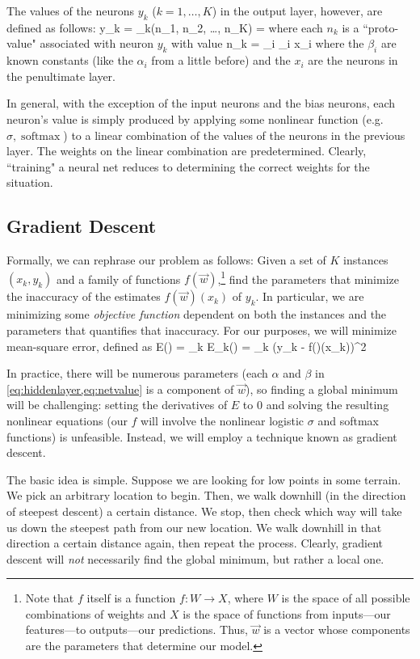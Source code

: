 \documentclass[10pt]{article}
\DeclareMathOperator{\softmax}{softmax}
\begin{document}
The values of the neurons $y_k$ ($k = 1, \dots, K$) in the output layer, however, are defined as follows:
\beq
y_k = \softmax_k(n_1, n_2, \dots, n_K) = 
\eeq
where each $n_k$ is a ``proto-value" associated with neuron $y_k$ with value
\beq
\label{eq:netvalue}
n_k = \sum_i \beta_i x_i
\eeq
where the $\beta_i$ are known constants (like the $\alpha_i$ from a little before) and the $x_i$ are the neurons in the penultimate layer.

In general, with the exception of the input neurons and the bias neurons, each neuron's value is simply produced by applying some nonlinear function (e.g. $\sigma, \softmax$) to a linear combination of the values of the neurons in the previous layer.
The weights on the linear combination are predetermined.
Clearly, ``training" a neural net reduces to determining the correct weights for the situation.

\subsection{Gradient Descent}

Formally, we can rephrase our problem as follows: Given a set of $K$ instances $(x_k, y_k)$ and a family of functions $f(\vec{w})$,\footnote{Note that $f$ itself is a function $f:W\to X$, where $W$ is the space of all possible combinations of weights and $X$ is the space of functions from inputs---our features---to outputs---our predictions. Thus, $\vec{w}$ is a vector whose components are the parameters that determine our model.} find the parameters that minimize the inaccuracy of the estimates $f(\vec{w})(x_k)$ of $y_k$.
In particular, we are minimizing some \emph{objective function} dependent on both the instances and the parameters that quantifies that inaccuracy.
For our purposes, we will minimize mean-square error, defined as
\beq
\label{eq:meansqerror}
E() = \sum_k E_k() = \sum_k (y_k - f()(x_k))^2
\eeq

In practice, there will be numerous parameters (each $\alpha$ and $\beta$ in \cref{eq:hiddenlayer,eq:netvalue} is a component of $\vec{w}$), so finding a global minimum will be challenging: setting the derivatives of $E$ to 0 and solving the resulting nonlinear equations (our $f$ will involve the nonlinear logistic $\sigma$ and softmax functions) is unfeasible.
Instead, we will employ a technique known as gradient descent.

The basic idea is simple.
Suppose we are looking for low points in some terrain.
We pick an arbitrary location to begin.
Then, we walk downhill (in the direction of steepest descent) a certain distance.
We stop, then check which way will take us down the steepest path from our new location.
We walk downhill in that direction a certain distance again, then repeat the process.
Clearly, gradient descent will \emph{not} necessarily find the global minimum, but rather a local one.
\end{document}
